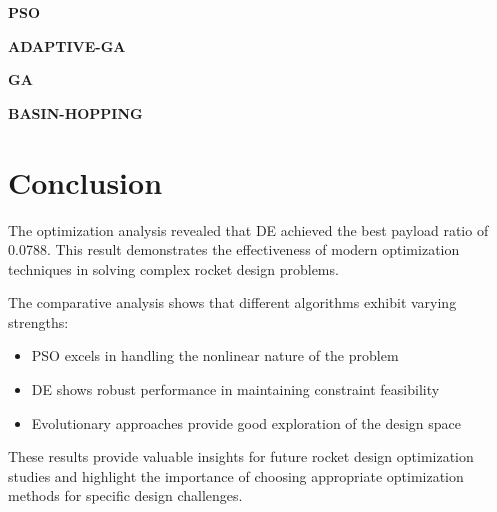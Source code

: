 \documentclass[11pt]{article}
\begin{document}
\item \textbf{PSO}
\begin{itemize}
\end{itemize}
\item \textbf{ADAPTIVE-GA}
\begin{itemize}
\end{itemize}
\item \textbf{GA}
\begin{itemize}
\end{itemize}
\item \textbf{BASIN-HOPPING}
\begin{itemize}
\end{itemize}

\section{Conclusion}
The optimization analysis revealed that DE achieved the best payload ratio of 0.0788. This result demonstrates the effectiveness of modern optimization techniques in solving complex rocket design problems.

The comparative analysis shows that different algorithms exhibit varying strengths:
\begin{itemize}
    \item PSO excels in handling the nonlinear nature of the problem \cite{pso_ascent_2013}
    \item DE shows robust performance in maintaining constraint feasibility \cite{de_ascent_2021}
    \item Evolutionary approaches provide good exploration of the design space \cite{evolutionary_rocket_2022}
\end{itemize}

These results provide valuable insights for future rocket design optimization studies and highlight the importance of choosing appropriate optimization methods for specific design challenges.


\end{document}
